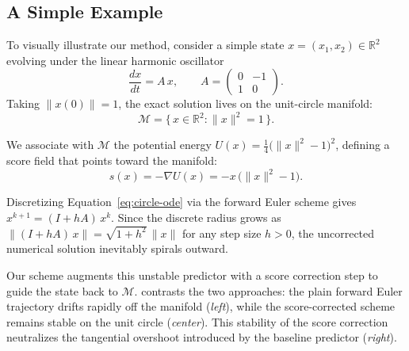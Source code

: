 \documentclass[letterpaper]{article} %
\def\Eqref#1{Equation~\ref{#1}}
\providecommand{\Eqref}[1]{\Cref{#1}}
\begin{document}
\subsection{A Simple Example}
\label{sec:simple-example}

To visually illustrate our method, consider a simple state \(x = (x_1, x_2) \in \mathbb{R}^2\) evolving under the linear harmonic oscillator
\begin{equation}
  \frac{dx}{dt} = A\,x,
  \qquad
  A = \begin{pmatrix} 0 & -1 \\ 1 & 0 \end{pmatrix}.
  \label{eq:circle-ode}
\end{equation}
Taking \(\lVert x(0) \rVert = 1\), the exact solution lives on the unit-circle manifold:
\begin{equation}
  \mathcal{M} = \bigl\{\, x \in \mathbb{R}^2 : \lVert x \rVert^2 = 1 \,\bigr\}.
  \label{eq:circle-manifold}
\end{equation}

We associate with $\mathcal{M}$ the potential energy $U(x) = \tfrac{1}{4}\bigl(\lVert x \rVert^2 - 1\bigr)^2$, defining a score field that points toward the manifold:
\begin{equation}
  s(x) = -\nabla U(x) = -x\,\bigl(\lVert x \rVert^2 - 1\bigr).
  \label{eq:circle-score}
\end{equation}

Discretizing \Eqref{eq:circle-ode} via the forward Euler scheme gives
$
  x^{k+1} = (I + hA)\,x^{k}
  \label{eq:circle-euler}
$.
Since the discrete radius grows as $\lVert (I+hA)\,x \rVert = \sqrt{1+h^2}\,\lVert x \rVert$ for any step size $h>0$, the uncorrected numerical solution inevitably spirals outward.

Our scheme augments this unstable predictor with a score correction step to guide the state back to $\mathcal{M}$.  contrasts the two approaches: the plain forward Euler trajectory drifts rapidly off the manifold (\emph{left}), while the score-corrected scheme remains stable on the unit circle (\emph{center}). This stability of the score correction neutralizes the tangential overshoot introduced by the baseline predictor (\emph{right}).





\end{document}
